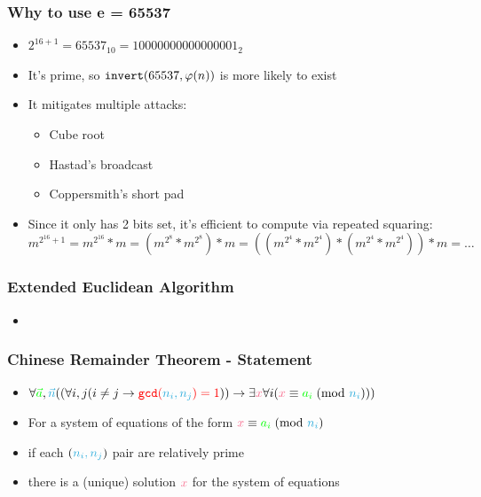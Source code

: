 \documentclass[aspectratio=169]{beamer}
\begin{document}
\begin{frame}[fragile]
\frametitle{Why to use e = 65537}
\begin{itemize}
\item $2^{16+1} = 65537_{10} = 10000000000000001_2$
\item It's prime, so $\verb|invert|(65537, \varphi(n))$ is more likely to exist
\item It mitigates multiple attacks:
\begin{itemize}
\item Cube root
\item Hastad's broadcast
\item Coppersmith's short pad
\end{itemize}
\item Since it only has 2 bits set, it's efficient to compute via repeated squaring:
$m^{2^{16}+1} = m^{2^{16}}*m = (m^{2^8}*m^{2^8})*m = ((m^{2^4}*m^{2^4})*(m^{2^4}*m^{2^4}))*m = \hdots$
\end{itemize}
\end{frame}

\begin{frame}[fragile]
\frametitle{Extended Euclidean Algorithm}
\begin{itemize}
\item {}
\end{itemize}
\end{frame}

\begin{frame}[fragile]
\frametitle{Chinese Remainder Theorem - Statement}
\begin{itemize}
\item $\forall {\color{green}\vec{a}}, {\color{cybercyan}\vec{n}}((\forall i,j(i \neq j \rightarrow {\color{red}\verb|gcd|({\color{cybercyan}n_i, n_j}) = 1})) \rightarrow \exists {\color{cyberpink}x} \forall i({\color{cyberpink}x} \equiv {\color{green}a_i}\hspace{1mm}(\text{mod }{\color{cybercyan}n_i})))$
\item For a system of equations of the form ${\color{cyberpink}x} \equiv {\color{green}a_i}\hspace{1mm}(\text{mod }{\color{cybercyan}n_i})$
\item if each $({\color{cybercyan}n_i, n_j})$ pair are {\color{red}relatively prime}
\item there is a (unique) solution ${\color{cyberpink}x}$ for the system of equations
\end{itemize}
\end{frame}
\end{document}
